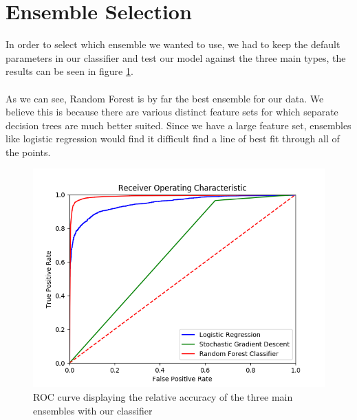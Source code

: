 \documentclass[12pt,twoside]{report}
\begin{document}
\section{Ensemble Selection}
In order to select which ensemble we wanted to use, we had to keep the default parameters in our classifier and test our model against the three main types, the results can be seen in figure \ref{fig:rocmultipleensembles}.
\\\\
As we can see, Random Forest is by far the best ensemble for our data. We believe this is because there are various distinct feature sets for which separate decision trees are much better suited. Since we have a large feature set, ensembles like logistic regression would find it difficult find a line of best fit through all of the points.
\begin{figure}[h]
    \centering
    \includegraphics[width=0.6\linewidth]{images/ROC_multiple_ensembles.png}
    \caption{ROC curve displaying the relative accuracy of the three main ensembles with our classifier}
    \label{fig:rocmultipleensembles}
\end{figure}
\end{document}
